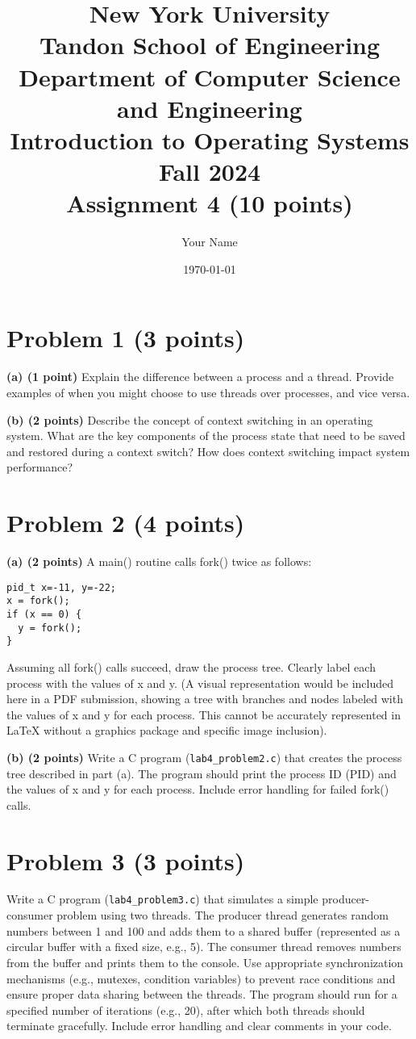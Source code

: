 \documentclass{article}
\title{New York University \\ Tandon School of Engineering \\ Department of Computer Science and Engineering \\ Introduction to Operating Systems \\ Fall 2024 \\ Assignment 4 (10 points)}
\author{Your Name}
\date{\today}
\begin{document}
\maketitle

\section*{Problem 1 (3 points)}

\textbf{(a) (1 point)}  Explain the difference between a process and a thread.  Provide examples of when you might choose to use threads over processes, and vice versa.

\textbf{(b) (2 points)} Describe the concept of context switching in an operating system.  What are the key components of the process state that need to be saved and restored during a context switch?  How does context switching impact system performance?


\section*{Problem 2 (4 points)}

\textbf{(a) (2 points)}  A main() routine calls fork() twice as follows:

\begin{verbatim}
pid_t x=-11, y=-22;
x = fork();
if (x == 0) {
  y = fork();
}
\end{verbatim}

Assuming all fork() calls succeed, draw the process tree.  Clearly label each process with the values of x and y. (A visual representation would be included here in a PDF submission, showing a tree with branches and nodes labeled with the values of x and y for each process. This cannot be accurately represented in LaTeX without a graphics package and specific image inclusion).

\textbf{(b) (2 points)} Write a C program (\texttt{lab4\_problem2.c}) that creates the process tree described in part (a). The program should print the process ID (PID) and the values of x and y for each process.  Include error handling for failed fork() calls.


\section*{Problem 3 (3 points)}

Write a C program (\texttt{lab4\_problem3.c}) that simulates a simple producer-consumer problem using two threads. The producer thread generates random numbers between 1 and 100 and adds them to a shared buffer (represented as a circular buffer with a fixed size, e.g., 5). The consumer thread removes numbers from the buffer and prints them to the console.  Use appropriate synchronization mechanisms (e.g., mutexes, condition variables) to prevent race conditions and ensure proper data sharing between the threads. The program should run for a specified number of iterations (e.g., 20), after which both threads should terminate gracefully.  Include error handling and clear comments in your code.
\end{document}
